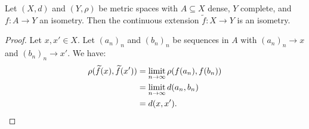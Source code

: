     \begin{proposition}
        Let $(X,d)$ and $(Y,\rho)$ be metric spaces with $A \subseteq X$ dense, $Y$ complete, and $f:A \rightarrow Y$ an isometry. Then the continuous extension $\widetilde{f}:X \rightarrow Y$ is an isometry.
    \end{proposition}
        \begin{proof}
            Let $x,x' \in X$. Let $(a_n)_n$ and $(b_n)_n$ be sequences in $A$ with $(a_n)_n \rightarrow x$ and $(b_n)_n \rightarrow x'$. We have:
                \begin{equation*}
                \begin{split}
                    \rho(\widetilde{f}(x),\widetilde{f}(x'))
                    & = \operatorname*{limit}_{n \rightarrow \infty}\rho(f(a_n),f(b_n)) \\
                    & = \operatorname*{limit}_{n \rightarrow \infty} d(a_n,b_n) \\
                    & = d(x,x'). \qedhere
                \end{split}
                \end{equation*}
        \end{proof}

